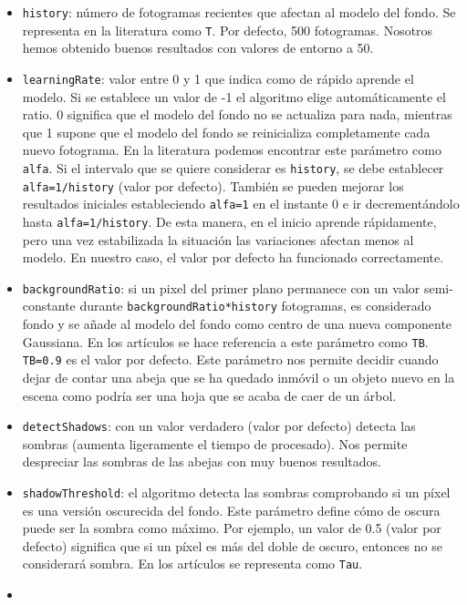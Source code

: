 \begin{itemize}
\tightlist
\item
  \texttt{history}: número de fotogramas recientes que afectan al modelo
  del fondo. Se representa en la literatura como \texttt{T}. Por
  defecto, 500 fotogramas. Nosotros hemos obtenido buenos resultados con
  valores de entorno a 50.
\item
  \texttt{learningRate}: valor entre 0 y 1 que indica como de rápido
  aprende el modelo. Si se establece un valor de -1 el algoritmo elige
  automáticamente el ratio. 0 significa que el modelo del fondo no se
  actualiza para nada, mientras que 1 supone que el modelo del fondo se
  reinicializa completamente cada nuevo fotograma. En la literatura
  podemos encontrar este parámetro como \texttt{alfa}. Si el intervalo
  que se quiere considerar es \texttt{history}, se debe establecer
  \texttt{alfa=1/history} (valor por defecto). También se pueden mejorar
  los resultados iniciales estableciendo \texttt{alfa=1} en el instante
  0 e ir decrementándolo hasta \texttt{alfa=1/history}. De esta manera,
  en el inicio aprende rápidamente, pero una vez estabilizada la
  situación las variaciones afectan menos al modelo. En nuestro caso, el
  valor por defecto ha funcionado correctamente.
\item
  \texttt{backgroundRatio}: si un pixel del primer plano permanece con
  un valor semi-constante durante \texttt{backgroundRatio*history}
  fotogramas, es considerado fondo y se añade al modelo del fondo como
  centro de una nueva componente Gaussiana. En los artículos se hace
  referencia a este parámetro como \texttt{TB}. \texttt{TB=0.9} es el
  valor por defecto. Este parámetro nos permite decidir cuando dejar de
  contar una abeja que se ha quedado inmóvil o un objeto nuevo en la
  escena como podría ser una hoja que se acaba de caer de un árbol.
\item
  \texttt{detectShadows}: con un valor verdadero (valor por defecto)
  detecta las sombras (aumenta ligeramente el tiempo de procesado). Nos
  permite despreciar las sombras de las abejas con muy buenos
  resultados.
\item
  \texttt{shadowThreshold}: el algoritmo detecta las sombras comprobando
  si un píxel es una versión oscurecida del fondo. Este parámetro define
  cómo de oscura puede ser la sombra como máximo. Por ejemplo, un valor
  de 0.5 (valor por defecto) significa que si un píxel es más del doble
  de oscuro, entonces no se considerará sombra. En los artículos se
  representa como \texttt{Tau}.
\item

\end{itemize}
